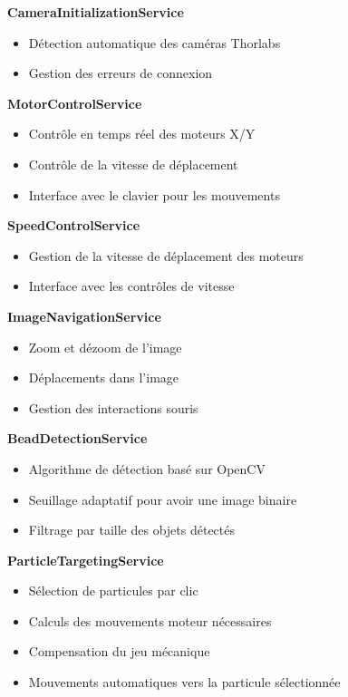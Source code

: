 \textbf{CameraInitializationService}
\begin{itemize}[label=\textbullet]
    \item Détection automatique des caméras Thorlabs
    \item Gestion des erreurs de connexion
\end{itemize}

\textbf{MotorControlService}
\begin{itemize}[label=\textbullet]
    \item Contrôle en temps réel des moteurs X/Y
    \item Contrôle de la vitesse de déplacement
    \item Interface avec le clavier pour les mouvements
\end{itemize}

\textbf{SpeedControlService}
\begin{itemize}[label=\textbullet]
    \item Gestion de la vitesse de déplacement des moteurs
    \item Interface avec les contrôles de vitesse
\end{itemize}

\textbf{ImageNavigationService}
\begin{itemize}[label=\textbullet]
    \item Zoom et dézoom de l'image
    \item Déplacements dans l'image
    \item Gestion des interactions souris
\end{itemize}

\textbf{BeadDetectionService}
\begin{itemize}[label=\textbullet]
    \item Algorithme de détection basé sur OpenCV
    \item Seuillage adaptatif pour avoir une image binaire
    \item Filtrage par taille des objets détectés
\end{itemize}

\textbf{ParticleTargetingService}
\begin{itemize}[label=\textbullet]
    \item Sélection de particules par clic
    \item Calculs des mouvements moteur nécessaires
    \item Compensation du jeu mécanique
    \item Mouvements automatiques vers la particule sélectionnée
\end{itemize}

